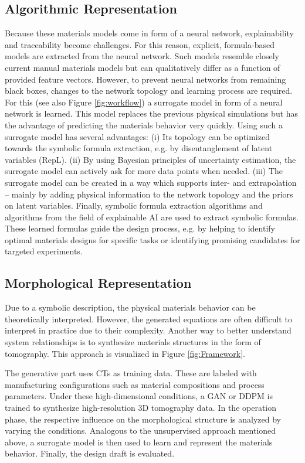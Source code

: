 \subsection{Algorithmic Representation}
\label{Algortith_Repr}
Because these materials models come in form of a neural network, explainability and traceability become challenges. For this reason, explicit, formula-based models are extracted from the neural network. Such models resemble closely current manual materials models but can qualitatively differ as a function of provided feature vectors. However, to prevent neural networks from remaining black boxes, changes to the network topology and learning process are required. For this (see also Figure \ref{fig:workflow}) a surrogate model in form of a neural network is learned. This model replaces the previous physical simulations but has the advantage of predicting the materials behavior very quickly. Using such a surrogate model has several advantages: (i) Its topology can be optimized towards the symbolic formula extraction, e.g. by disentanglement of latent variables (RepL). (ii) By using Bayesian principles of uncertainty estimation, the surrogate model can actively ask for more data points when needed. (iii) The surrogate model can be created in a way which supports inter- and extrapolation -- mainly by adding physical information to the network topology and the priors on latent variables. Finally, symbolic formula extraction algorithms and algorithms from the field of explainable AI are used to extract symbolic formulas. These learned formulas guide the design process, e.g. by helping to identify optimal materials designs for specific tasks or identifying promising candidates for targeted experiments.

\subsection{Morphological Representation}
\label{Morph_Repr}
Due to a symbolic description, the physical materials behavior can be theoretically interpreted. However, the generated equations are often difficult to interpret in practice due to their complexity. Another way to better understand system relationships is to synthesize materials structures in the form of tomography. This approach is visualized in Figure \ref{fig:Framework}.

The generative part uses CTs as training data. These are labeled with manufacturing configurations such as material compositions and process parameters. Under these high-dimensional conditions, a GAN or DDPM is trained to synthesize high-resolution 3D tomography data. In the operation phase, the respective influence on the morphological structure is analyzed by varying the conditions. Analogous to the unsupervised approach mentioned above, a surrogate model is then used to learn and represent the materials behavior. Finally, the design draft is evaluated.